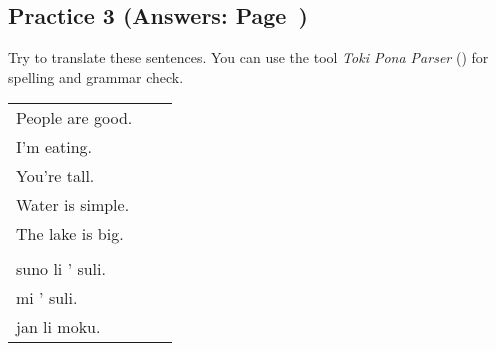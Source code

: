 \subsection*{Practice 3 (Answers: Page~\pageref{'basic_sentences'})}
%
Try to translate these sentences. 
You can use the tool \textit{Toki Pona Parser} (\cite{www:rowa:02}) for spelling and grammar check. 

\begin{supertabular}{p{5cm}|ll}
People are good. && \\ %
I'm eating. &&  \\ %
You're tall. &&  \\ %
Water is simple. &&  \\ %
The lake is big. &&\\ %
 && \\
suno li ' suli. &&  \\%
mi ' suli. &&  \\%
jan li moku. &&  \\%
\end{supertabular} \\%
%
